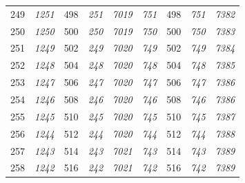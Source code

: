 \documentclass[10pt,fleqn]{article}
\begin{document}
\begin{longtable}{c|cccccccc}
249 & {\color{blue} \it 1251 \rm} & {\color{black} 498} & {\color{blue} \it 251 \rm} & {\color{blue} \it 7019 \rm} & {\color{blue} \it 751 \rm} & {\color{black} 498} & {\color{blue} \it 751 \rm} & {\color{blue} \it 7382 \rm} \\
250 & {\color{blue} \it 1250 \rm} & {\color{black} 500} & {\color{blue} \it 250 \rm} & {\color{blue} \it 7019 \rm} & {\color{blue} \it 750 \rm} & {\color{black} 500} & {\color{blue} \it 750 \rm} & {\color{blue} \it 7383 \rm} \\
251 & {\color{blue} \it 1249 \rm} & {\color{black} 502} & {\color{blue} \it 249 \rm} & {\color{blue} \it 7020 \rm} & {\color{blue} \it 749 \rm} & {\color{black} 502} & {\color{blue} \it 749 \rm} & {\color{blue} \it 7384 \rm} \\
252 & {\color{blue} \it 1248 \rm} & {\color{black} 504} & {\color{blue} \it 248 \rm} & {\color{blue} \it 7020 \rm} & {\color{blue} \it 748 \rm} & {\color{black} 504} & {\color{blue} \it 748 \rm} & {\color{blue} \it 7385 \rm} \\
253 & {\color{blue} \it 1247 \rm} & {\color{black} 506} & {\color{blue} \it 247 \rm} & {\color{blue} \it 7020 \rm} & {\color{blue} \it 747 \rm} & {\color{black} 506} & {\color{blue} \it 747 \rm} & {\color{blue} \it 7386 \rm} \\
254 & {\color{blue} \it 1246 \rm} & {\color{black} 508} & {\color{blue} \it 246 \rm} & {\color{blue} \it 7020 \rm} & {\color{blue} \it 746 \rm} & {\color{black} 508} & {\color{blue} \it 746 \rm} & {\color{blue} \it 7386 \rm} \\
255 & {\color{blue} \it 1245 \rm} & {\color{black} 510} & {\color{blue} \it 245 \rm} & {\color{blue} \it 7020 \rm} & {\color{blue} \it 745 \rm} & {\color{black} 510} & {\color{blue} \it 745 \rm} & {\color{blue} \it 7387 \rm} \\
256 & {\color{blue} \it 1244 \rm} & {\color{black} 512} & {\color{blue} \it 244 \rm} & {\color{blue} \it 7020 \rm} & {\color{blue} \it 744 \rm} & {\color{black} 512} & {\color{blue} \it 744 \rm} & {\color{blue} \it 7388 \rm} \\
257 & {\color{blue} \it 1243 \rm} & {\color{black} 514} & {\color{blue} \it 243 \rm} & {\color{blue} \it 7021 \rm} & {\color{blue} \it 743 \rm} & {\color{black} 514} & {\color{blue} \it 743 \rm} & {\color{blue} \it 7389 \rm} \\
258 & {\color{blue} \it 1242 \rm} & {\color{black} 516} & {\color{blue} \it 242 \rm} & {\color{blue} \it 7021 \rm} & {\color{blue} \it 742 \rm} & {\color{black} 516} & {\color{blue} \it 742 \rm} & {\color{blue} \it 7389 \rm} \\

\end{longtable}
\end{document}
